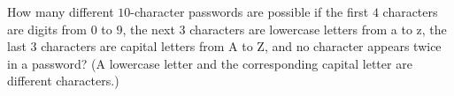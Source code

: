 How many different $10$-character passwords are possible if the first $4$ characters are digits from $0$ to $9$, the next $3$ characters are lowercase letters from a to z, the last $3$ characters are capital letters from A to Z, and no character appears twice in a password? (A lowercase letter and the corresponding capital letter are different characters.)
